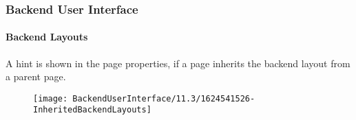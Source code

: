 %

\begin{frame}[fragile]
	\frametitle{Backend User Interface}
	\framesubtitle{Backend Layouts}

	A hint is shown in the page properties, if a page inherits the backend layout
	from a parent page.

	\begin{figure}
		\texttt{[image: BackendUserInterface/11.3/1624541526-InheritedBackendLayouts]}
	\end{figure}

\end{frame}

